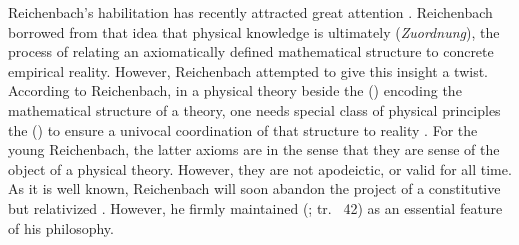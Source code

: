 \documentclass[draft]{article}
\newcommand{\rhp}[2]{(\cite[#1]{Reichenbach1920a}; tr.\ \citeyear{Reichenbach1969} #2)\xspace}
\begin{document}

Reichenbach's habilitation has recently attracted great attention \citep{Friedman2001}. Reichenbach borrowed from \citet{Schlick1918} that idea that physical knowledge is ultimately (\emph{Zuordnung}), the process of relating an axiomatically defined mathematical structure to concrete empirical reality. However, Reichenbach attempted  to give this insight a  twist. According to Reichenbach, in a physical theory beside the  () encoding the mathematical structure of a theory, one needs special class of physical principles the  () to ensure a univocal coordination of that structure to reality \citep{Padovani2009}. For the young Reichenbach, the latter axioms are \apr in the sense that they are  sense of the object of a physical theory. However, they are not apodeictic, or valid for all time. As it is well known, Reichenbach will soon abandon the project of a constitutive but relativized \apr. However, he firmly maintained  \rhp{**}{42} as an essential feature of his philosophy. 







\end{document}

